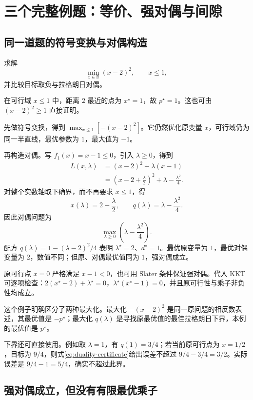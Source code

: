 \documentclass[UTF8]{ctexart}
\begin{document}
\section{三个完整例题：等价、强对偶与间隙}
\label{sec:duality-examples}

\subsection{同一道题的符号变换与对偶构造}

\begin{example}[带上界约束的二次目标]
\label{ex:duality-quadratic}
求解
\[
 \min_{x\in\mathbb R}(x-2)^2,\qquad x\leq1,
\]
并比较目标取负与拉格朗日对偶。
\end{example}
\begin{solve}
在可行域 $x\leq1$ 中，距离 $2$ 最近的点为 $x^\star=1$，故 $p^\star=1$。这也可由 $(x-2)^2\geq1$ 直接证明。

先做符号变换，得到 $\max_{x\leq1}[-(x-2)^2]$。它仍然优化原变量 $x$，可行域仍为同一半直线，最优参数为 $1$，最大值为 $-1$。

再构造对偶。写 $f_1(x)=x-1\leq0$，引入 $\lambda\geq0$，得到
\begin{align*}
 L(x,\lambda)
 &=(x-2)^2+\lambda(x-1)\\
 &=\left(x-2+\frac\lambda2\right)^2
       +\lambda-\frac{\lambda^2}{4}.
\end{align*}
对整个实数轴取下确界，而不再要求 $x\leq1$，得
\[
 x(\lambda)=2-\frac\lambda2,
 \qquad q(\lambda)=\lambda-\frac{\lambda^2}{4}.
\]
因此对偶问题为
\[
 \max_{\lambda\geq0}\left(\lambda-\frac{\lambda^2}{4}\right).
\]
配方 $q(\lambda)=1-(\lambda-2)^2/4$ 表明 $\lambda^\star=2$、$d^\star=1$。最优原变量为 $1$，最优对偶变量为 $2$，数值不同；但原、对偶最优值同为 $1$，强对偶成立。

原可行点 $x=0$ 严格满足 $x-1<0$，也可用 Slater 条件保证强对偶。代入 KKT 可逐项检查：$2(x^\star-2)+\lambda^\star=0$，$\lambda^\star(x^\star-1)=0$，并且原可行性与乘子非负性均成立。
\end{solve}

这个例子明确区分了两种最大化。最大化 $-(x-2)^2$ 是同一原问题的相反数表述，其最优值是 $-p^\star$；最大化 $q(\lambda)$ 是寻找原最优值的最佳拉格朗日下界，本例的最优值是 $p^\star$。

下界还可直接使用。例如取 $\lambda=1$，有 $q(1)=3/4$；若当前原可行点为 $x=1/2$，目标为 $9/4$，则式\eqref{eq:duality-certificate}给出误差不超过 $9/4-3/4=3/2$。实际误差是 $9/4-1=5/4$，确实不超过此界。

\subsection{强对偶成立，但没有有限最优乘子}
\end{document}

